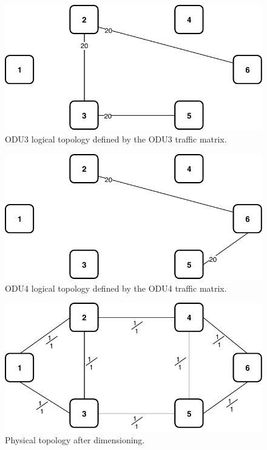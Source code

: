 \begin{figure}[h!]
\centering
\includegraphics[width=12cm]{sdf/ilp/opaque_protection/figures/logical_topology_ODU3_high}
\caption{ODU3 logical topology defined by the ODU3 traffic matrix.}
\label{logical_ODU3_protectionhigh}
\end{figure}

\begin{figure}[h!]
\centering
\includegraphics[width=12cm]{sdf/ilp/opaque_protection/figures/logical_topology_ODU4_high}
\caption{ODU4 logical topology defined by the ODU4 traffic matrix.}
\label{logical_ODU4_protectionhigh}
\end{figure}
\newpage
\begin{figure}[h!]
\centering
\includegraphics[width=13cm]{sdf/ilp/opaque_protection/figures/physical_topology}
\caption{Physical topology after dimensioning.}
\label{physical_protectionhigh}
\end{figure}

